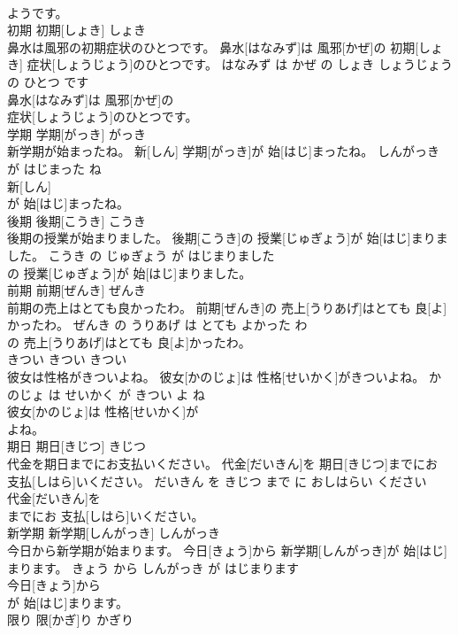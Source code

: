 \documentclass[8pt]{extreport}
\begin{document}
\begin{CJK}{UTF8}{min}
\\	ようです。			
\\	初期	初期[しょき]	しょき	
\\	鼻水は風邪の初期症状のひとつです。	鼻水[はなみず]は 風邪[かぜ]の 初期[しょき] 症状[しょうじょう]のひとつです。	はなみず は かぜ の しょき しょうじょう の ひとつ です	
\\	鼻水[はなみず]は 風邪[かぜ]の
\\	症状[しょうじょう]のひとつです。			
\\	学期	学期[がっき]	がっき	
\\	新学期が始まったね。	新[しん] 学期[がっき]が 始[はじ]まったね。	しんがっき が はじまった ね	
\\	新[しん]
\\	が 始[はじ]まったね。			
\\	後期	後期[こうき]	こうき	
\\	後期の授業が始まりました。	後期[こうき]の 授業[じゅぎょう]が 始[はじ]まりました。	こうき の じゅぎょう が はじまりました	
\\	の 授業[じゅぎょう]が 始[はじ]まりました。			
\\	前期	前期[ぜんき]	ぜんき	
\\	前期の売上はとても良かったわ。	前期[ぜんき]の 売上[うりあげ]はとても 良[よ]かったわ。	ぜんき の うりあげ は とても よかった わ	
\\	の 売上[うりあげ]はとても 良[よ]かったわ。			
\\	きつい	きつい	きつい	
\\	彼女は性格がきついよね。	彼女[かのじょ]は 性格[せいかく]がきついよね。	かのじょ は せいかく が きつい よ ね	
\\	彼女[かのじょ]は 性格[せいかく]が
\\	よね。			
\\	期日	期日[きじつ]	きじつ	
\\	代金を期日までにお支払いください。	代金[だいきん]を 期日[きじつ]までにお 支払[しはら]いください。	だいきん を きじつ まで に おしはらい ください	
\\	代金[だいきん]を
\\	までにお 支払[しはら]いください。			
\\	新学期	新学期[しんがっき]	しんがっき	
\\	今日から新学期が始まります。	今日[きょう]から 新学期[しんがっき]が 始[はじ]まります。	きょう から しんがっき が はじまります	
\\	今日[きょう]から
\\	が 始[はじ]まります。			
\\	限り	限[かぎ]り	かぎり	

\end{CJK}
\end{document}
